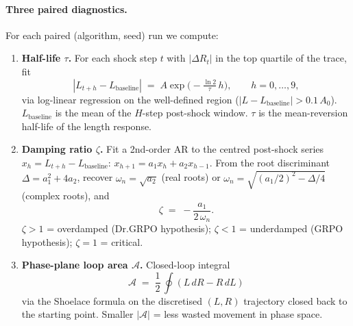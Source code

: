 \documentclass{article}
\begin{document}
\paragraph{Three paired diagnostics.}
For each paired (algorithm, seed) run we compute:
\begin{enumerate}
\item \textbf{Half-life $\tau$.} For each shock step $t$ with
      $|\Delta R_t|$ in the top quartile of the trace, fit
      \begin{equation}\label{eq:lb76-tau}
      |L_{t+h} - L_{\mathrm{baseline}}| \;=\; A \exp\!\bigl(-\tfrac{\ln 2}{\tau}\,h\bigr),
      \qquad h = 0, \ldots, 9,
      \end{equation}
      via log-linear regression on the well-defined region
      ($|L - L_{\mathrm{baseline}}| > 0.1\,A_0$). $L_{\mathrm{baseline}}$
      is the mean of the $H$-step post-shock window. $\tau$ is the
      mean-reversion half-life of the length response.
\item \textbf{Damping ratio $\zeta$.} Fit a 2nd-order AR to the
      centred post-shock series $x_h = L_{t+h} - L_{\mathrm{baseline}}$:
      $x_{h+1} = a_1 x_h + a_2 x_{h-1}$. From the root discriminant
      $\Delta = a_1^2 + 4 a_2$, recover
      $\omega_n = \sqrt{a_2}$ (real roots) or
      $\omega_n = \sqrt{(a_1/2)^2 - \Delta/4}$ (complex roots), and
      \begin{equation}\label{eq:lb76-zeta}
      \zeta \;=\; -\frac{a_1}{2\,\omega_n}.
      \end{equation}
      $\zeta > 1$ = overdamped (Dr.GRPO hypothesis);
      $\zeta < 1$ = underdamped (GRPO hypothesis);
      $\zeta = 1$ = critical.
\item \textbf{Phase-plane loop area $\mathcal{A}$.} Closed-loop integral
      \begin{equation}\label{eq:lb76-loop}
      \mathcal{A} \;=\; \frac{1}{2}\,\oint (L\,dR - R\,dL)
      \end{equation}
      via the Shoelace formula on the discretised $(L, R)$
      trajectory closed back to the starting point. Smaller
      $|\mathcal{A}|$ = less wasted movement in phase space.
\end{enumerate}
\end{document}
